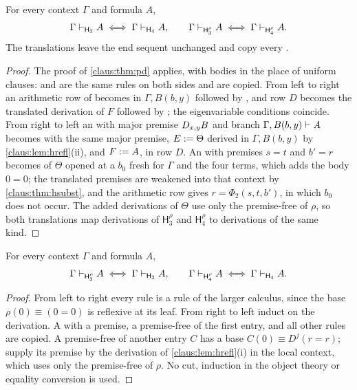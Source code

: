 \begin{theorem}
\label{claus:thm:hfusion}
For every context $\Gamma$ and formula $A$,
\[
 \Gamma\vdash_{\mathsf{H}_3}A\iff\Gamma\vdash_{\mathsf{H}_4}A,
 \qquad
 \Gamma\vdash_{\mathsf{H}_3^{\rho}}A\iff\Gamma\vdash_{\mathsf{H}_4^{\rho}}A .
\]
The translations leave the end sequent unchanged and copy every
.
\end{theorem}
\begin{proof}
The proof of \cref{claus:thm:pd} applies, with bodies in the place of
uniform clauses:  and  are the same rules on
both sides and are copied. From left to right an arithmetic row of
 becomes  in $\Gamma,B(b,y)$ followed by
, and row $D$ becomes the translated derivation of $F$
followed by ; the eigenvariable conditions coincide. From
right to left an  with major premise $D_{x,y}B$ and branch
$\Gamma,B(b,y)\vdash A$ becomes  with the same major
premise, $E\mathrel{:=}\Theta$ derived in $\Gamma,B(b,y)$ by
\cref{claus:lem:hrefl}(ii), and $F\mathrel{:=} A$, in row $D$. An 
with premises $s=t$ and $b'=r$ becomes  of $\Theta$
opened at a $b_0$ fresh for $\Gamma$ and the four terms, which adds the
body $0=0$; the translated premises are weakened into that context by
\cref{claus:thm:hsubst}, and the arithmetic row gives $r=\Phi_2(s,t,b')$, in
which $b_0$ does not occur. The added derivations of $\Theta$ use only the
premise-free  of $\rho$, so both translations map derivations
of $\mathsf{H}_3^{\rho}$ and $\mathsf{H}_4^{\rho}$ to derivations of the
same kind.
\end{proof}

\begin{theorem}
\label{claus:thm:hseed}
For every context $\Gamma$ and formula $A$,
\[
 \Gamma\vdash_{\mathsf{H}_3^{\rho}}A\iff\Gamma\vdash_{\mathsf{H}_3}A,
 \qquad
 \Gamma\vdash_{\mathsf{H}_4^{\rho}}A\iff\Gamma\vdash_{\mathsf{H}_4}A .
\]
\end{theorem}
\begin{proof}
From left to right every rule is a rule of the larger calculus, since the
base $\rho(0)\equiv(0=0)$ is reflexive at its leaf. From right to left
induct on the derivation. A  with a premise, a premise-free
 of the first entry, and all other rules are copied. A
premise-free  of another entry $C$ has a base
$C(0)\equiv D^j(r=r)$; supply its premise by the derivation of
\cref{claus:lem:hrefl}(i) in the local context, which uses only the
premise-free  of $\rho$. No cut, induction in the object
theory or equality conversion is used.
\end{proof}

